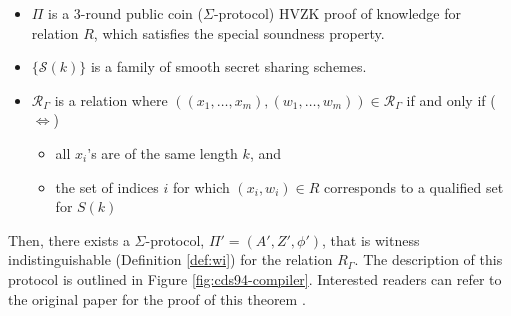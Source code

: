 \begin{itemize}
    \item $\Pi$ is a 3-round public coin ($\Sigma$-protocol) HVZK proof of knowledge for relation $R$, which satisfies the special soundness property.
    \item $\{\mathcal S(k)\}$ is a family of smooth secret sharing schemes.
    \item $\mathcal R_\Gamma$ is a relation where $((x_1,\ldots,x_m),(w_1,\ldots,w_m)) \in \mathcal R_\Gamma$ if and only if ($\iff$)
    \begin{itemize}
        \item all $x_i$'s are of the same length $k$, and 
        \item the set of indices $i$ for which $(x_i,w_i) \in R$ corresponds to a qualified set for $S(k)$
    \end{itemize}
\end{itemize}

Then, there exists a $\Sigma$-protocol, $\Pi' = (A', Z', \phi')$, that is witness indistinguishable (Definition \ref{def:wi}) for the relation $R_\Gamma$. The description of this protocol is outlined in Figure \ref{fig:cds94-compiler}. Interested readers can refer to the original paper for the proof of this theorem \cite{CDS94}. 

